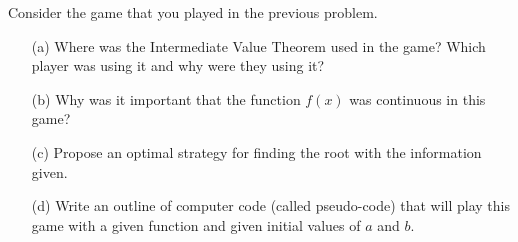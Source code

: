 \begin{problem}
    Consider the game that you played in the previous problem.
    \begin{enumerate}
        \item[(a)] Where was the Intermediate Value Theorem used in the game?  Which
            player was using it and why were they using it?
        \item[(b)] Why was it important that the function $f(x)$ was continuous in this
            game?
        \item[(c)] Propose an optimal strategy for finding the root with the information
            given.
        \item[(d)] Write an outline of computer code (called pseudo-code) that will play
            this game with a given function and given initial values of $a$ and $b$.
    \end{enumerate}
\end{problem}

